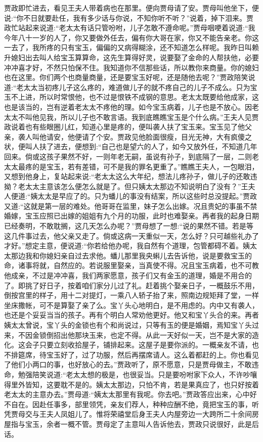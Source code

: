 \begin{parag}
    贾政即忙进去，看见王夫人带着病也在那里。便向贾母请了安。贾母叫他坐下，便说:“你不日就要赴任，我有多少话与你说，不知你听不听？”说着，掉下泪来。贾政忙站起来说道:“老太太有话只管吩咐，儿子怎敢不遵命呢。”贾母咽哽着说道:“我今年八十一岁的人了，你又要做外任去，偏有你大哥在家，你又不能告亲老。你这一去了，我所疼的只有宝玉，偏偏的又病得糊涂，还不知道怎么样呢。我昨日叫赖升媳妇出去叫人给宝玉算算命，这先生算得好灵，说要娶了金命的人帮扶他，必要冲冲喜才好，不然只怕保不住。我知道你不信那些话，所以教你来商量。你的媳妇也在这里。你们两个也商量商量，还是要宝玉好呢，还是随他去呢？”贾政陪笑说道:“老太太当初疼儿子这么疼的，难道做儿子的就不疼自己的儿子不成么。只为宝玉不上进，所以时常恨他，也不过是恨铁不成钢的意思。老太太既要给他成家，这也是该当的，岂有逆着老太太不疼他的理。如今宝玉病着，儿子也是不放心。因老太太不叫他见我，所以儿子也不敢言语。我到底瞧瞧宝玉是个什么病。”王夫人见贾政说着也有些眼圈儿红，知道心里是疼的，便叫袭人扶了宝玉来。宝玉见了他父亲，袭人叫他请安，他便请了个安。贾政见他脸面很瘦，目光无神，大有疯傻之状，便叫人扶了进去，便想到:“自己也是望六的人了，如今又放外任，不知道几年回来。倘或这孩子果然不好，一则年老无嗣，虽说有孙子，到底隔了一层，二则老太太最疼的是宝玉，若有差错，可不是我的罪名更重了。”瞧瞧王夫人，一包眼泪，又想到他身上，复站起来说:“老太太这么大年纪，想法儿疼孙子，做儿子的还敢违拗？老太太主意该怎么便怎么就是了。但只姨太太那边不知说明白了没有？”王夫人便道:“姨太太是早应了的。只为蟠儿的事没有结案，所以这些时总没提起。”贾政又道:“这就是第一层的难处。他哥哥在监里，妹子怎么出嫁。况且贵妃的事虽不禁婚嫁，宝玉应照已出嫁的姐姐有九个月的功服，此时也难娶亲。再者我的起身日期已经奏明，不敢耽搁，这几天怎么办呢？”贾母想了一想:“说的果然不错。若是等这几件事过去，他父亲又走了。倘或这病一天重似一天，怎么好？只可越些礼办了才好。”想定主意，便说道:“你若给他办呢，我自然有个道理，包管都碍不着。姨太太那边我和你媳妇亲自过去求他。蟠儿那里我央蝌儿去告诉他，说是要救宝玉的命，诸事将就，自然应的。若说服里娶亲，当真使不得。况且宝玉病着，也不可教他成亲，不过是冲冲喜，我们两家愿意，孩子们又有金玉的道理，婚是不用合的了。即挑了好日子，按着咱们家分儿过了礼。赶着挑个娶亲日子，一概鼓乐不用，倒按宫里的样子，用十二对提灯，一乘八人轿子抬了来，照南边规矩拜了堂，一样坐床撒帐，可不是算娶了亲了么。宝丫头心地明白，是不用虑的。内中又有袭人，也还是个妥妥当当的孩子。再有个明白人常劝他更好。他又和宝丫头合的来。再者姨太太曾说，宝丫头的金锁也有个和尚说过，只等有玉的便是婚姻，焉知宝丫头过来，不因金锁倒招出他那块玉来，也定不得。从此一天好似一天，岂不是大家的造化。这会子只要立刻收拾屋子，铺排起来。这屋子是要你派的。一概亲友不请，也不排筵席，待宝玉好了，过了功服，然后再摆席请人。这么着都赶的上。你也看见了他们小两口的事，也好放心的去。”贾政听了，原不愿意，只是贾母做主，不敢违命，勉强陪笑说道:“老太太想的极是，也很妥当。只是要吩咐家下众人，不许吵嚷得里外皆知，这要耽不是的。姨太太那边，只怕不肯，若是果真应了，也只好按着老太太的主意办去。”贾母道:“姨太太那里有我呢。你去吧。”贾政答应出来，心中好不自在。因赴任事多，部里领凭，亲友们荐人，种种应酬不绝，竟把宝玉的事，听凭贾母交与王夫人凤姐儿了。惟将荣禧堂后身王夫人内屋旁边一大跨所二十余间房屋指与宝玉，余者一概不管。贾母定了主意叫人告诉他去，贾政只说很好，此是后话。
\end{parag}


